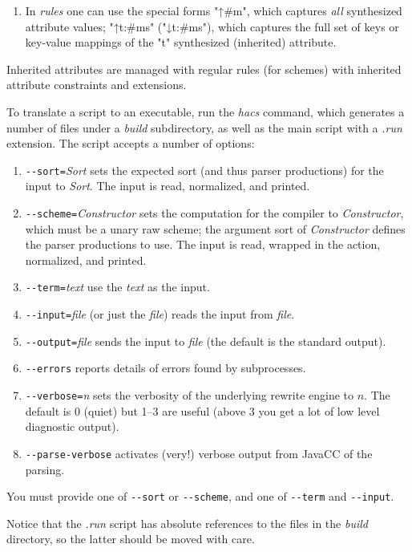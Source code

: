 \documentclass[11pt]{article} %
\begin{document}
\begin{manual}
\begin{enumerate}
  \item In \emph{rules} one can use the special forms "↑#m", which captures \emph{all} synthesized
    attribute values; "↑t{:#ms}" ("↓t{:#ms}"), which captures the full set of keys or key-value mappings of the
    "t" synthesized (inherited) attribute.

  \end{enumerate}
  Inherited attributes are managed with regular rules (for schemes) with inherited attribute
  constraints and extensions.
\end{manual}

\begin{manual}\label{man:run}\leavevmode
  To translate a \HAX script to an executable, run the \emph{hacs} command, which generates a number
  of files under a \emph{build} subdirectory, as well as the main script with a \emph{.run}
  extension.  The script accepts a number of options:
  \begin{enumerate}

  \item \verb"--sort="\emph{Sort} sets the expected sort (and thus parser productions) for the input to
    \emph{Sort}. The input is read, normalized, and printed.

  \item \verb"--scheme="\emph{Constructor} sets the computation for the compiler to \emph{Constructor},
    which must be a unary raw scheme; the argument sort of \emph{Constructor} defines the parser
    productions to use.  The input is read, wrapped in the action, normalized, and printed.

  \item \verb"--term="\emph{text} use the \emph{text} as the input.

  \item \verb"--input="\emph{file} (or just the \emph{file}) reads the input from \emph{file}.

  \item \verb"--output="\emph{file} sends the input to \emph{file} (the default is the standard output).

  \item \verb"--errors" reports details of errors found by subprocesses.

  \item \verb"--verbose="\emph{n} sets the verbosity of the underlying \CRSX rewrite engine to $n$. The
    default is 0 (quiet) but 1--3 are useful (above 3 you get a lot of low level diagnostic output).

  \item \verb"--parse-verbose" activates (very!) verbose output from JavaCC of the parsing.

  \end{enumerate}
  You must provide one of \verb"--sort" or \verb"--scheme", and one of \verb"--term" and \verb"--input".

  Notice that the \emph{.run} script has absolute references to the files in the \emph{build}
  directory, so the latter should be moved with care.
\end{manual}
\end{document}
